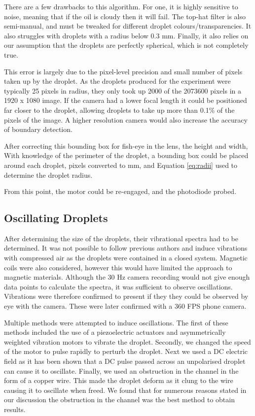 \documentclass{physics_article_B}
\begin{document}
            There are a few drawbacks to this algorithm. For one, it is highly sensitive to noise, meaning that if the oil is cloudy then it will fail. The top-hat filter is also semi-manual, and must be tweaked for different droplet colours/transparencies. It also struggles with droplets with a radius below 0.3 mm. Finally, it also relies on our assumption that the droplets are perfectly spherical, which is not completely true.
            
            This error is largely due to the pixel-level precision and small number of pixels taken up by the droplet. As the droplets produced for the experiment were typically 25 pixels in radius, they only took up 2000 of the 2073600 pixels in a 1920 x 1080 image. If the camera had a lower focal length it could be positioned far closer to the droplet, allowing droplets to take up more than 0.1\% of the pixels of the image. A higher resolution camera would also increase the accuracy of boundary detection. 
            
            After correcting this bounding box for fish-eye in the lens, the height and width, With knowledge of the perimeter of the droplet, a bounding box could be placed around each droplet, pixels converted to mm, and Equation \ref{eq:radii} used to determine the droplet radius.
            
            From this point, the motor could be re-engaged, and the photodiode probed.
    
    \subsection{Oscillating Droplets\label{sect:method:oscillating}}
        
        After determining the size of the droplets, their vibrational spectra had to be determined. It was not possible to follow previous authors and induce vibrations with compressed air as the droplets were contained in a closed system. Magnetic coils were also considered, however this would have limited the approach to magnetic materials. Although the 30 Hz camera recording would not give enough data points to calculate the spectra, it was sufficient to observe oscillations. Vibrations were therefore confirmed to present if they they could be observed by eye with the camera. These were later confirmed with a 360 FPS phone camera.
        
        Multiple methods were attempted to induce oscillations. The first of these methods included the use of a piezoelectric actuators and asymmetrically weighted vibration motors to vibrate the droplet. Secondly, we changed the speed of the motor to pulse rapidly to perturb the droplet. Next we used a DC electric field as it has been shown that a DC pulse passed across an unpolarised droplet can cause it to oscillate. Finally, we used an obstruction in the channel in the form of a copper wire. This made the droplet deform as it clung to the wire causing it to oscillate when freed. We found that for numerous reasons stated in our discussion the obstruction in the channel was the best method to obtain results.
        
\end{document}

